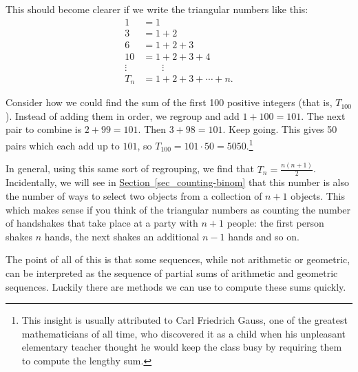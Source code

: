 \documentclass[12pt,]{book}
\theoremstyle{plain}
\theoremstyle{definition}
\theoremstyle{definition}
\theoremstyle{definition}
\numberwithin{equation}{chapter}
\newcommand{\amp}{&}
\begin{document}
\par
\hypertarget{p-132}{}%
This should become clearer if we write the triangular numbers like this:%
\begin{align*}
1 \amp = 1\\
3 \amp = 1+2\\
6 \amp = 1 + 2 + 3\\
10 \amp = 1+2 + 3+ 4\\
\vdots \amp \qquad \vdots\\
T_n \amp = 1 + 2 + 3 + \cdots + n.
\end{align*}
%
\par
\hypertarget{p-133}{}%
Consider how we could find the sum of the first 100 positive integers (that is, \(T_{100}\)). Instead of adding them in order, we regroup and add \(1+100 = 101\). The next pair to combine is \(2+99 = 101\). Then \(3+98 = 101\). Keep going. This gives 50 pairs which each add up to \(101\), so \(T_{100} = 101\cdot 50 = 5050\).\footnote{This insight is usually attributed to Carl Friedrich Gauss, one of the greatest mathematicians of all time, who discovered it as a child when his unpleasant elementary teacher thought he would keep the class busy by requiring them to compute the lengthy sum.\label{fn-1}}%
\par
\hypertarget{p-134}{}%
In general, using this same sort of regrouping, we find that \(T_n = \frac{n(n+1)}{2}\). Incidentally, we will see in \hyperref[sec_counting-binom]{Section~\ref{sec_counting-binom}} that this number is also the number of ways to select two objects from a collection of \(n+1\) objects.  This which makes sense if you think of the triangular numbers as counting the number of handshakes that take place at a party with \(n+1\) people: the first person shakes \(n\) hands, the next shakes an additional \(n-1\) hands and so on.%
\par
\hypertarget{p-135}{}%
The point of all of this is that some sequences, while not arithmetic or geometric, can be interpreted as the sequence of partial sums of arithmetic and geometric sequences. Luckily there are methods we can use to compute these sums quickly.%
\typeout{************************************************}
\typeout{************************************************}
\end{document}
